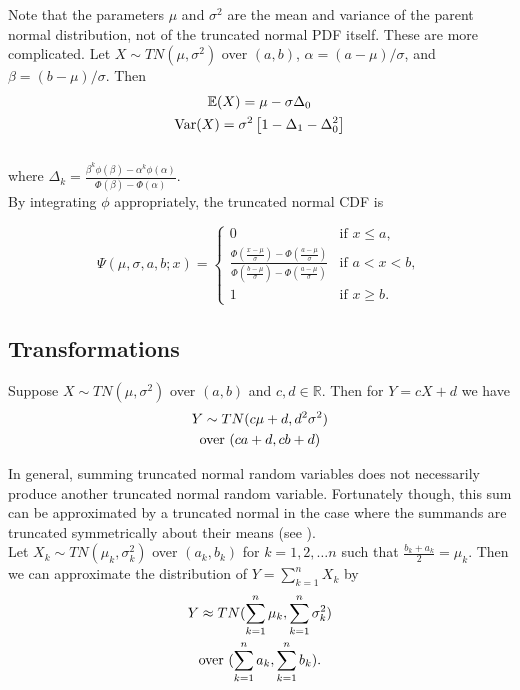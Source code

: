 \documentclass[twocolumn]{article}
\begin{document}
Note that the parameters $\mu$ and $\sigma^{2}$ are the mean and variance of the parent normal distribution, not of the truncated normal PDF itself. These are more complicated. Let $X \sim TN(\mu ,\sigma^{2})$ over $ (a,b)$, $\alpha =(a-\mu )/\sigma$, and $\beta =(b-\mu )/\sigma$. Then
\begin{gather}
{{\mathbb E}} (X) = \mu - \sigma \Delta_{0} \notag \\
\operatorname {Var}(X)= \sigma^{2}\left[1 - \Delta_{1}-\Delta_{0}^{2}\right] \notag
\end{gather} \\
where $\Delta_{k} = {\frac {\beta^{k} \phi (\beta )-\alpha^{k} \phi (\alpha)}{\Phi (\beta )-\Phi (\alpha )}}$. \\

By integrating $\phi$ appropriately, the truncated normal CDF is

$$\Psi(\mu ,\sigma ,a,b;x)={\begin{cases}0&{\text{if }} x \leq a,\\{\frac{\Phi ({\frac {x-\mu }{\sigma }})-\Phi ({\frac {a-\mu }{\sigma }})}{\Phi ({\frac {b-\mu }{\sigma }})-\Phi ({\frac {a-\mu }{\sigma }})}}&{\text{if }} a < x < b,\\1&{\text{if }} x \geq b.\end{cases}}$$


\subsection{Transformations}
Suppose $X \sim TN(\mu ,\sigma^{2})$ over $(a,b)$ and $c,d \in {{\mathbb R}}$. Then for $Y= cX+d$ we have
\begin{gather}
Y \sim TN(c\mu+d ,d^{2}\sigma^{2}) \\
\text{over }(ca+d,cb+d) \notag
\end{gather} 
 
In general, summing truncated normal random variables does not necessarily produce another truncated normal random variable. Fortunately though, this sum can be approximated by a truncated normal in the case where the summands are truncated symmetrically about their means (see \cite{eng}). \\

Let $X_{k} \sim TN(\mu_{k}  ,\sigma^{2}_{k})$ over $(a_{k} ,b_{k})$ for $k=1,2,\ldots n$ such that $\frac{b_{k}+a_{k}}{2} = \mu_{k}$. Then we can approximate the distribution of $Y=\sum_{k=1}^{n} X_{k} $ by
\begin{gather}
Y \approx TN(\sum_{k=1}^{n}{\mu_{k}} ,\sum_{k=1}^{n}\sigma_{k}^{2}) \\
\text{over } (\sum_{k=1}^{n} a_{k}, \sum_{k=1}^{n} b_{k}). \notag
\end{gather} 
\end{document}
